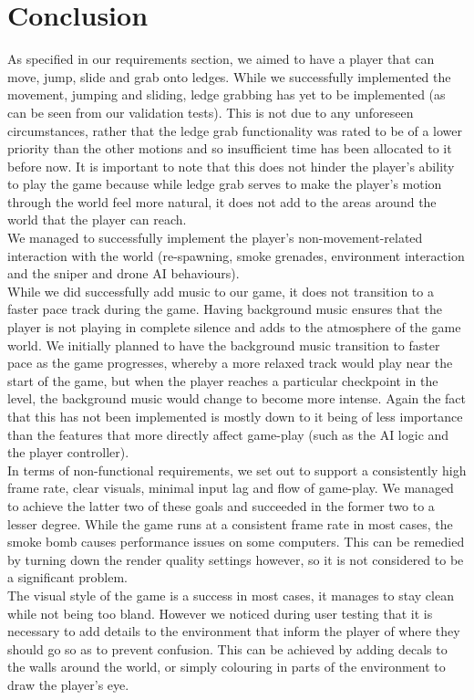 \documentclass[11pt,a4paper]{article}
\begin{document}
\section{Conclusion}
As specified in our requirements section, we aimed to have a player that can move, jump, slide and grab onto ledges. While we successfully implemented the movement, jumping and sliding, ledge grabbing has yet to be implemented (as can be seen from our validation tests). This is not due to any unforeseen circumstances, rather that the ledge grab functionality was rated to be of a lower priority than the other motions and so insufficient time has been allocated to it before now.
It is important to note that this does not hinder the player's ability to play the game because while ledge grab serves to make the player's motion through the world feel more natural, it does not add to the areas around the world that the player can reach. \\
We managed to successfully implement the player's non-movement-related interaction with the world (re-spawning, smoke grenades, environment interaction and the sniper and drone AI behaviours). \\
While we did successfully add music to our game, it does not transition to a faster pace track during the game. Having background music ensures that the player is not playing in complete silence and adds to the atmosphere of the game world. We initially planned to have the background music transition to faster pace as the game progresses, whereby a more relaxed track would play near the start of the game, but when the player reaches a particular checkpoint in the level, the background music would change to become more intense.
Again the fact that this has not been implemented is mostly down to it being of less importance than the features that more directly affect game-play (such as the AI logic and the player controller). \\
In terms of non-functional requirements, we set out to support a consistently high frame rate, clear visuals, minimal input lag and flow of game-play. We managed to achieve the latter two of these goals and succeeded in the former two to a lesser degree.
While the game runs at a consistent frame rate in most cases, the smoke bomb causes performance issues on some computers. This can be remedied by turning down the render quality settings however, so it is not considered to be a significant problem. \\
The visual style of the game is a success in most cases, it manages to stay clean while not being too bland. However we noticed during user testing that it is necessary to add details to the environment that inform the player of where they should go so as to prevent confusion. This can be achieved by adding decals to the walls around the world, or simply colouring in parts of the environment to draw the player's eye.
\end{document}
